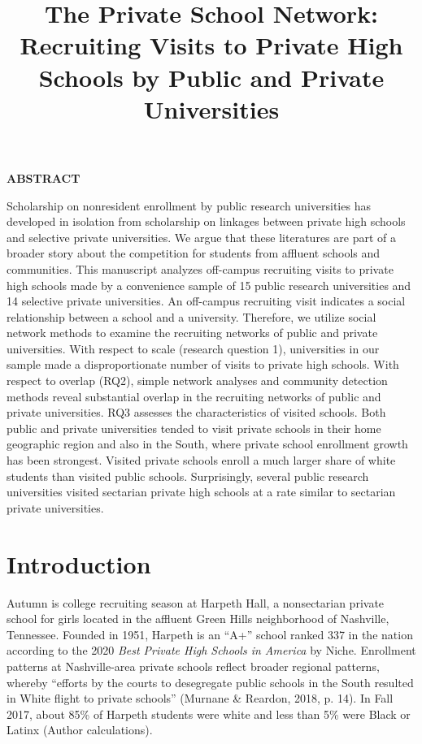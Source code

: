 \documentclass[
  12pt,
]{article}
\title{The Private School Network: Recruiting Visits to Private High Schools by Public and Private Universities}
\author{}
\date{\vspace{-2.5em}}
\begin{document}
\maketitle


\textbf{ABSTRACT}

Scholarship on nonresident enrollment by public research universities has developed in isolation from scholarship on linkages between private high schools and selective private universities. We argue that these literatures are part of a broader story about the competition for students from affluent schools and communities. This manuscript analyzes off-campus recruiting visits to private high schools made by a convenience sample of 15 public research universities and 14 selective private universities. An off-campus recruiting visit indicates a social relationship between a school and a university. Therefore, we utilize social network methods to examine the recruiting networks of public and private universities. With respect to scale (research question 1), universities in our sample made a disproportionate number of visits to private high schools. With respect to overlap (RQ2), simple network analyses and community detection methods reveal substantial overlap in the recruiting networks of public and private universities. RQ3 assesses the characteristics of visited schools. Both public and private universities tended to visit private schools in their home geographic region and also in the South, where private school enrollment growth has been strongest. Visited private schools enroll a much larger share of white students than visited public schools. Surprisingly, several public research universities visited sectarian private high schools at a rate similar to sectarian private universities.

\newpage
{}

\hypertarget{introduction}{%
\section{Introduction}\label{introduction}}

Autumn is college recruiting season at Harpeth Hall, a nonsectarian private school for girls located in the affluent Green Hills neighborhood of Nashville, Tennessee. Founded in 1951, Harpeth is an ``A+'' school ranked 337 in the nation according to the 2020 \emph{Best Private High Schools in America} by Niche. Enrollment patterns at Nashville-area private schools reflect broader regional patterns, whereby ``efforts by the courts to desegregate public schools in the South resulted in White flight to private schools'' (Murnane \& Reardon, 2018, p. 14). In Fall 2017, about 85\% of Harpeth students were white and less than 5\% were Black or Latinx (Author calculations).
\end{document}

